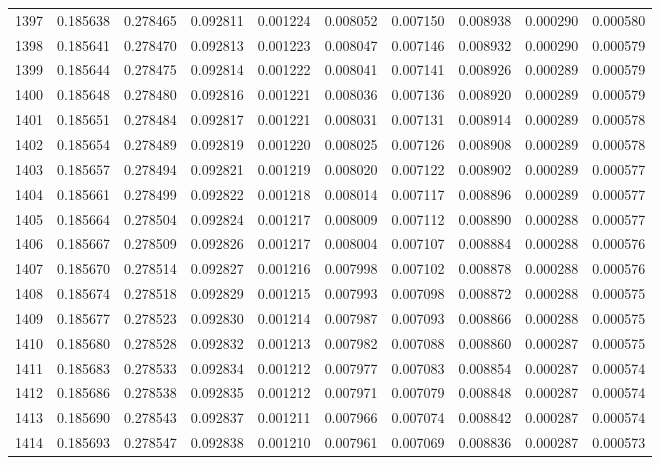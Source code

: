 \begin{tabular}{lrrrrrrrrr}
1397 & 0.185638 & 0.278465 & 0.092811 & 0.001224 & 0.008052 & 0.007150 & 0.008938 & 0.000290 & 0.000580 \\
1398 & 0.185641 & 0.278470 & 0.092813 & 0.001223 & 0.008047 & 0.007146 & 0.008932 & 0.000290 & 0.000579 \\
1399 & 0.185644 & 0.278475 & 0.092814 & 0.001222 & 0.008041 & 0.007141 & 0.008926 & 0.000289 & 0.000579 \\
1400 & 0.185648 & 0.278480 & 0.092816 & 0.001221 & 0.008036 & 0.007136 & 0.008920 & 0.000289 & 0.000579 \\
1401 & 0.185651 & 0.278484 & 0.092817 & 0.001221 & 0.008031 & 0.007131 & 0.008914 & 0.000289 & 0.000578 \\
1402 & 0.185654 & 0.278489 & 0.092819 & 0.001220 & 0.008025 & 0.007126 & 0.008908 & 0.000289 & 0.000578 \\
1403 & 0.185657 & 0.278494 & 0.092821 & 0.001219 & 0.008020 & 0.007122 & 0.008902 & 0.000289 & 0.000577 \\
1404 & 0.185661 & 0.278499 & 0.092822 & 0.001218 & 0.008014 & 0.007117 & 0.008896 & 0.000289 & 0.000577 \\
1405 & 0.185664 & 0.278504 & 0.092824 & 0.001217 & 0.008009 & 0.007112 & 0.008890 & 0.000288 & 0.000577 \\
1406 & 0.185667 & 0.278509 & 0.092826 & 0.001217 & 0.008004 & 0.007107 & 0.008884 & 0.000288 & 0.000576 \\
1407 & 0.185670 & 0.278514 & 0.092827 & 0.001216 & 0.007998 & 0.007102 & 0.008878 & 0.000288 & 0.000576 \\
1408 & 0.185674 & 0.278518 & 0.092829 & 0.001215 & 0.007993 & 0.007098 & 0.008872 & 0.000288 & 0.000575 \\
1409 & 0.185677 & 0.278523 & 0.092830 & 0.001214 & 0.007987 & 0.007093 & 0.008866 & 0.000288 & 0.000575 \\
1410 & 0.185680 & 0.278528 & 0.092832 & 0.001213 & 0.007982 & 0.007088 & 0.008860 & 0.000287 & 0.000575 \\
1411 & 0.185683 & 0.278533 & 0.092834 & 0.001212 & 0.007977 & 0.007083 & 0.008854 & 0.000287 & 0.000574 \\
1412 & 0.185686 & 0.278538 & 0.092835 & 0.001212 & 0.007971 & 0.007079 & 0.008848 & 0.000287 & 0.000574 \\
1413 & 0.185690 & 0.278543 & 0.092837 & 0.001211 & 0.007966 & 0.007074 & 0.008842 & 0.000287 & 0.000574 \\
1414 & 0.185693 & 0.278547 & 0.092838 & 0.001210 & 0.007961 & 0.007069 & 0.008836 & 0.000287 & 0.000573 \\

\end{tabular}
